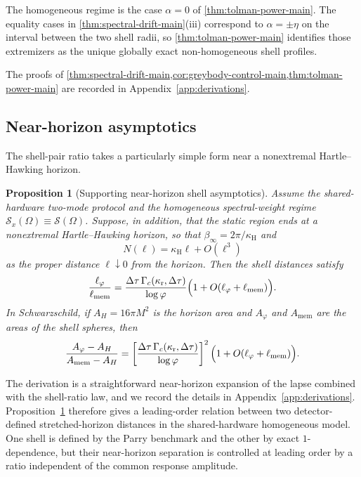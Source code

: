 \documentclass[11pt]{article}
\newtheorem{proposition}[theorem]{Proposition}
\theoremstyle{definition}
\begin{document}
The homogeneous regime is the case $\alpha=0$ of \cref{thm:tolman-power-main}. The equality cases in \cref{thm:spectral-drift-main}(iii) correspond to $\alpha=\pm\eta$ on the interval between the two shell radii, so \cref{thm:tolman-power-main} identifies those extremizers as the unique globally exact non-homogeneous shell profiles.

The proofs of \cref{thm:spectral-drift-main,cor:greybody-control-main,thm:tolman-power-main} are recorded in Appendix~\ref{app:derivations}.

\subsection{Near-horizon asymptotics}

The shell-pair ratio takes a particularly simple form near a nonextremal Hartle--Hawking horizon.

\begin{proposition}[Supporting near-horizon shell asymptotics]\label{thm:horizon-main}
Assume the shared-hardware two-mode protocol and the homogeneous spectral-weight regime $\mathcal S_x(\Omega)\equiv\mathcal S(\Omega)$. Suppose, in addition, that the static region ends at a nonextremal Hartle--Hawking horizon, so that $\beta_\infty=2\pi/\kappa_{\mathrm H}$ and
\begin{equation}\label{eq:horizon-main}
N(\ell)=\kappa_{\mathrm H}\ell+O(\ell^3)
\end{equation}
as the proper distance $\ell\downarrow0$ from the horizon. Then the shell distances satisfy
\begin{equation}\label{eq:ell-ratio-main}
\frac{\ell_{\varphi}}{\ell_{\mathrm{mem}}}
=
\frac{\Delta\tau\,\Gamma_c(\kappa_{\mathrm r},\Delta\tau)}{\log\varphi}
\Bigl(1+O(\ell_{\varphi}+\ell_{\mathrm{mem}})\Bigr).
\end{equation}
In Schwarzschild, if $A_H=16\pi M^2$ is the horizon area and $A_{\varphi}$ and $A_{\mathrm{mem}}$ are the areas of the shell spheres, then
\begin{equation}\label{eq:area-ratio-main}
\frac{A_{\varphi}-A_H}{A_{\mathrm{mem}}-A_H}
=
\left[
\frac{\Delta\tau\,\Gamma_c(\kappa_{\mathrm r},\Delta\tau)}{\log\varphi}
\right]^2
\Bigl(1+O(\ell_{\varphi}+\ell_{\mathrm{mem}})\Bigr).
\end{equation}
\end{proposition}

The derivation is a straightforward near-horizon expansion of the lapse combined with the shell-ratio law, and we record the details in Appendix~\ref{app:derivations}. Proposition~\ref{thm:horizon-main} therefore gives a leading-order relation between two detector-defined stretched-horizon distances in the shared-hardware homogeneous model. One shell is defined by the Parry benchmark and the other by exact $1$-dependence, but their near-horizon separation is controlled at leading order by a ratio independent of the common response amplitude.
\end{document}
